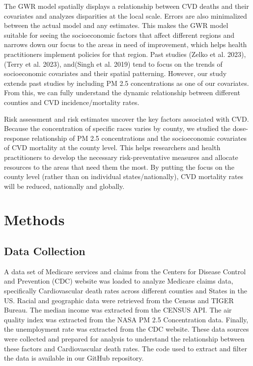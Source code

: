 \documentclass[
]{article}
\begin{document}
The GWR model spatially displays a relationship between CVD deaths and
their covariates and analyzes disparities at the local scale. Errors are
also minimalized between the actual model and any estimates. This makes
the GWR model suitable for seeing the socioeconomic factors that affect
different regions and narrows down our focus to the areas in need of
improvement, which helps health practitioners implement policies for
that region. Past studies (Zelko et al. 2023),(Terry et al. 2023),
and(Singh et al. 2019) tend to focus on the trends of socioeconomic
covariates and their spatial patterning. However, our study extends past
studies by including PM 2.5 concentrations as one of our covariates.
From this, we can fully understand the dynamic relationship between
different counties and CVD incidence/mortality rates.~

Risk assessment and risk estimates uncover the key factors associated
with CVD. Because the concentration of specific races varies by county,
we studied the dose-response relationship of PM 2.5 concentrations and
the socioeconomic covariates of CVD mortality at the county level. This
helps researchers and health practitioners to develop the necessary
risk-preventative measures and allocate resources to the areas that need
them the most. By putting the focus on the county level (rather than on
individual states/nationally), CVD mortality rates will be reduced,
nationally and globally.~

\section{Methods}\label{methods}

\subsection{Data Collection}\label{data-collection}

A data set of Medicare services and claims from the Centers for Disease
Control and Prevention (CDC) website was loaded to analyze Medicare
claims data, specifically Cardiovascular death rates across different
counties and States in the US. Racial and geographic data were retrieved
from the Census and TIGER Bureau. The median income was extracted from
the CENSUS API. The air quality index was extracted from the NASA PM 2.5
Concentration data. Finally, the unemployment rate was extracted from
the CDC website. These data sources were collected and prepared for
analysis to understand the relationship between these factors and
Cardiovascular death rates. The code used to extract and filter the data
is available in our GitHub repository.
\end{document}
